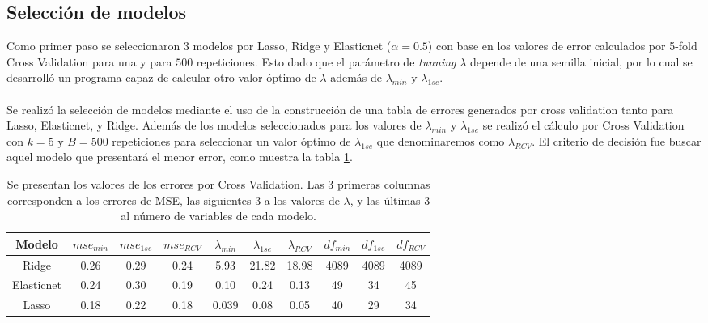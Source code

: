 \documentclass[11pt]{article}
\begin{document}
\subsection{Selección de modelos}
Como primer paso se seleccionaron 3 modelos por Lasso, Ridge y Elasticnet ($\alpha=0.5$) con base en los valores de error calculados por 5-fold Cross Validation para una y para $500$ repeticiones. Esto dado que el parámetro de \emph{tunning} $\lambda$ depende de una semilla inicial, por lo cual se desarrolló un programa capaz de calcular otro valor óptimo de $\lambda$ además de $\lambda_{min}$ y $\lambda_{1se}$.
\\
\\
Se realizó la selección de modelos mediante el uso de la construcción de una tabla de errores generados por cross validation tanto para Lasso, Elasticnet, y Ridge. Además de los modelos seleccionados para los valores de $\lambda_{min}$ y $\lambda_{1se}$ se realizó el cálculo por Cross Validation con $k=5$ y $B=500$ repeticiones para seleccionar un valor óptimo de $\lambda_{1se}$ que denominaremos como $\lambda_{RCV}$. El criterio de decisión fue buscar aquel modelo que presentará el menor error, como muestra la tabla \ref{tabla:MS}.

\begin{table}[htbp]
    \begin{center}
    \begin{tabular}{c|c|c|c|c|c|c|c|c|c}
    \toprule
    Modelo     &   $mse_{min}$ &  $mse_{1se}$ & $mse_{RCV}$ & $\lambda_{min}$ & $\lambda_{1se}$ & $\lambda_{RCV}$ & $df_{min}$ & $df_{1se}$ & $df_{RCV}$ \\
    \midrule
    Ridge      & 0.26 & 0.29 & 0.24 & 5.93 & 21.82 & 18.98 & 4089 & 4089 & 4089 \\ 
    Elasticnet & 0.24 & 0.30 & 0.19 & 0.10 & 0.24 & 0.13 &  49  & 34 & 45 \\
    Lasso      & 0.18 & 0.22 & 0.18 & 0.039 & 0.08 & 0.05 &  40  & 29 & 34 \\ 
    \bottomrule
    \end{tabular}
    \caption{Se presentan los valores de los errores por Cross Validation. Las $3$ primeras columnas corresponden a los errores de MSE, las siguientes $3$ a los valores de $\lambda$, y las últimas $3$ al número de variables de cada modelo.}
    \label{tabla:MS}
    \end{center}
\end{table}
\end{document}
